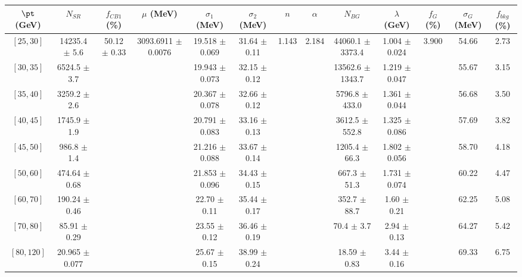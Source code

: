 \begin{tabular}{c||c|c|c|c|c|c|c|c|c|c|c||c}
$\pt$ (GeV) & $N_{SR}$ & $f_{CB1}$ (\%) & $\mu$ (MeV) & $\sigma_1$ (MeV) & $\sigma_2$ (MeV) & $n$ & $\alpha$ & $N_{BG}$ & $\lambda$ (GeV) & $f_G$ (\%) & $\sigma_G$ (MeV) & $f_{bkg}$ (\%) \\
\hline
$[25, 30]$ & 14235.4 $\pm$ 5.6 & \multirow{9}{*}{50.12 $\pm$ 0.33} & \multirow{9}{*}{3093.6911 $\pm$ 0.0076} & 19.518 $\pm$ 0.069 & 31.64 $\pm$ 0.11 & \multirow{9}{*}{1.143} & \multirow{9}{*}{2.184} & 44060.1 $\pm$ 3373.4 & 1.004 $\pm$ 0.024 & \multirow{9}{*}{3.900} & 54.66 & 2.73\\
$[30, 35]$ & 6524.5 $\pm$ 3.7 &  &  & 19.943 $\pm$ 0.073 & 32.15 $\pm$ 0.12 &  &  & 13562.6 $\pm$ 1343.7 & 1.219 $\pm$ 0.047 &  & 55.67 & 3.15\\
$[35, 40]$ & 3259.2 $\pm$ 2.6 &  &  & 20.367 $\pm$ 0.078 & 32.66 $\pm$ 0.12 &  &  & 5796.8 $\pm$ 433.0 & 1.361 $\pm$ 0.044 &  & 56.68 & 3.50\\
$[40, 45]$ & 1745.9 $\pm$ 1.9 &  &  & 20.791 $\pm$ 0.083 & 33.16 $\pm$ 0.13 &  &  & 3612.5 $\pm$ 552.8 & 1.325 $\pm$ 0.086 &  & 57.69 & 3.82\\
$[45, 50]$ & 986.8 $\pm$ 1.4 &  &  & 21.216 $\pm$ 0.088 & 33.67 $\pm$ 0.14 &  &  & 1205.4 $\pm$ 66.3 & 1.802 $\pm$ 0.056 &  & 58.70 & 4.18\\
$[50, 60]$ & 474.64 $\pm$ 0.68 &  &  & 21.853 $\pm$ 0.096 & 34.43 $\pm$ 0.15 &  &  & 667.3 $\pm$ 51.3 & 1.731 $\pm$ 0.074 &  & 60.22 & 4.47\\
$[60, 70]$ & 190.24 $\pm$ 0.46 &  &  & 22.70 $\pm$ 0.11 & 35.44 $\pm$ 0.17 &  &  & 352.7 $\pm$ 88.7 & 1.60 $\pm$ 0.21 &  & 62.25 & 5.08\\
$[70, 80]$ & 85.91 $\pm$ 0.29 &  &  & 23.55 $\pm$ 0.12 & 36.46 $\pm$ 0.19 &  &  & 70.4 $\pm$ 3.7 & 2.94 $\pm$ 0.13 &  & 64.27 & 5.42\\
$[80, 120]$ & 20.965 $\pm$ 0.077 &  &  & 25.67 $\pm$ 0.15 & 38.99 $\pm$ 0.24 &  &  & 18.59 $\pm$ 0.83 & 3.44 $\pm$ 0.16 &  & 69.33 & 6.75\\
\end{tabular}
